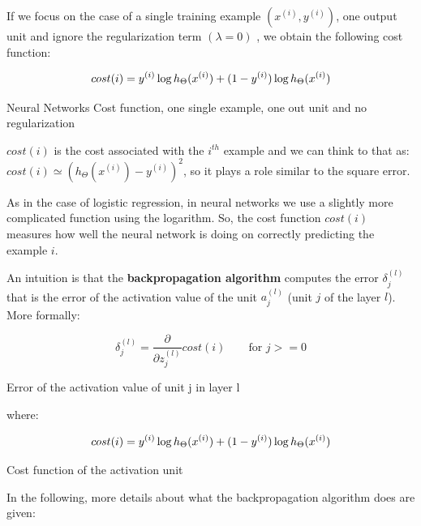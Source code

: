     
If we focus on the case of a single training example $(x^{(i)}, y^{(i)})$, one output unit and ignore the regularization     term $(\lambda = 0)$ , we obtain the following cost function:

\begin{eqfloat}[H]
\begin{equation}
	cost(i)  =  y^{(i)} \log h_\Theta(x^{(i)}) + (1 - y^{(i)}) \log h_\Theta(x^{(i)})  \\ 
\end{equation}
      \addtocounter{equation}{-1}
        \caption{ Neural Networks Cost function, one single example, one out unit and no regularization}
        \label{eq:nncostfunc2}
    \end{eqfloat}

$cost(i)$ is the cost associated with the $i^{th}$ example and we can think to that as: $cost(i)  \simeq  (h_\Theta(x^{(i)}) - y^{(i)})^2$, so it plays a role similar to the square error.

As in the case of logistic regression, in neural networks we use a slightly more complicated function using the logarithm. So, the cost function $cost(i)$ measures how well the neural network is doing on correctly predicting the example $i$.

An intuition is that the {\bf backpropagation algorithm} computes the error $\delta_j^{(l)}$ that is the error  of the activation value of the unit $a_j^{(l)}$ (unit $j$ of the layer $l$). More formally:

\begin{eqfloat}[H]
\begin{equation}
\delta_j^{(l)}  = \frac{\partial}{\partial z_j^{(l)}} cost(i)  \qquad \text{for } j >= 0 
\end{equation}
      \addtocounter{equation}{-1}
        \caption{ Error of the activation value of unit j in layer l}
        \label{eq:deltaerror}
    \end{eqfloat}
    
    where:
    \begin{eqfloat}[H]
\begin{equation}
	cost(i)  =  y^{(i)} \log h_\Theta(x^{(i)}) + (1 - y^{(i)}) \log h_\Theta(x^{(i)})  \\ 
\end{equation}
      \addtocounter{equation}{-1}
        \caption{  Cost function of the activation unit}
        \label{eq:nncostfunc3}
    \end{eqfloat}
    
In the following, more details about what the backpropagation algorithm does are given:

